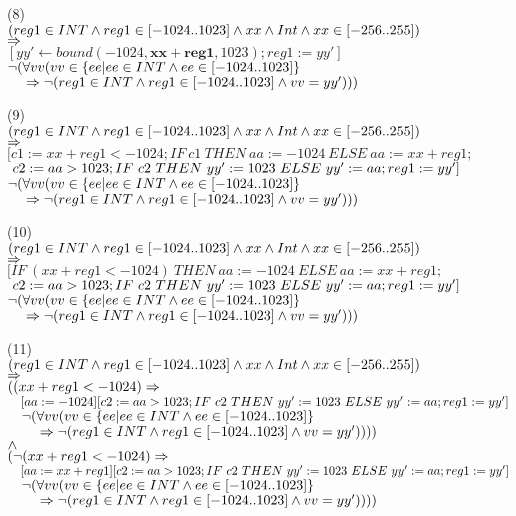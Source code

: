 \bigskip\noindent
(8)\\
$(reg1\in INT\et reg1\in[-1024..1023]\et xx\et Int\et xx\in[-256..255])$\\
$\fleche$\\
$[yy'\longleftarrow bound(-1024, {\mathbf {xx+reg1}}, 1023); reg1:=yy']$ \\
$\neg(\forall vv (vv\in \{ ee | ee\in INT \et ee\in [-1024..1023] \}$\\
$\tab{1em} \fleche\neg(reg1\in INT\et reg1\in[-1024..1023]\et vv = yy')))$

\bigskip\noindent
(9)\\
$(reg1\in INT\et reg1\in[-1024..1023]\et xx\et Int\et xx\in[-256..255])$\\
$\fleche$\\
$[c1:= {xx+reg1} < -1024; IF~ c1 ~THEN~ aa := -1024 ~ELSE~ aa := {xx+reg1};$\\
$\tab{0.3em} c2:= aa > 1023; IF~ c2 ~THEN~ yy' := 1023 ~ELSE~ yy' := aa; reg1:=yy']$\\
$\neg(\forall vv (vv\in \{ ee | ee\in INT \et ee\in [-1024..1023] \}$\\
$\tab{1em} \fleche\neg(reg1\in INT\et reg1\in[-1024..1023]\et vv = yy')))$

\bigskip\noindent
(10)\\
$(reg1\in INT\et reg1\in[-1024..1023]\et xx\et Int\et xx\in[-256..255])$\\
$\fleche$\\
$[IF~ ({xx+reg1} < -1024) ~THEN~ aa := -1024 ~ELSE~ aa := {xx+reg1};$\\
$\tab{0.3em} c2:= aa > 1023; IF~ c2 ~THEN~ yy' := 1023 ~ELSE~ yy' := aa; reg1:=yy']$\\
$\neg(\forall vv (vv\in \{ ee | ee\in INT \et ee\in [-1024..1023] \}$\\
$\tab{1em} \fleche\neg(reg1\in INT\et reg1\in[-1024..1023]\et vv = yy')))$

\bigskip\noindent
(11)\\
$(reg1\in INT\et reg1\in[-1024..1023]\et xx\et Int\et xx\in[-256..255])$\\
$\fleche$\\
$(({xx+reg1} < -1024)\fleche$\\
$\tab{1em}[aa := -1024][c2:= aa > 1023; IF~ c2 ~THEN~ yy' := 1023 ~ELSE~ yy' := aa; reg1:=yy']$\\
$\tab{1em}\neg(\forall vv (vv\in \{ ee | ee\in INT \et ee\in [-1024..1023] \}$\\
$\tab{2em}\fleche\neg(reg1\in INT\et reg1\in[-1024..1023]\et vv = yy'))))$\\
$\et$\\
$(\neg({xx+reg1} < -1024)\fleche$\\
$\tab{1em}[aa := {xx+reg1}][c2:= aa > 1023; IF~ c2 ~THEN~ yy' := 1023 ~ELSE~ yy' := aa; reg1:=yy']$\\
$\tab{1em}\neg(\forall vv (vv\in \{ ee | ee\in INT \et ee\in [-1024..1023] \}$\\
$\tab{2em}\fleche\neg(reg1\in INT\et reg1\in[-1024..1023]\et vv = yy'))))$


